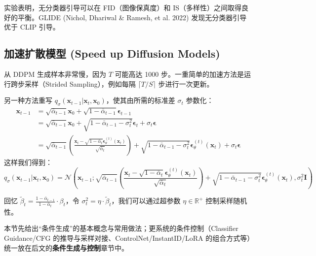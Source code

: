 \documentclass[zihao=-4, fontset=windows]{ctexart}
\begin{document}
实验表明，无分类器引导可以在 FID（图像保真度）和 IS（多样性）之间取得良好的平衡。GLIDE (Nichol, Dhariwal \& Ramesh, et al. 2022) 发现无分类器引导优于 CLIP 引导。

\subsection{加速扩散模型 (Speed up Diffusion Models)}
从 DDPM 生成样本非常慢，因为 $T$ 可能高达 1000 步。一重简单的加速方法是运行跨步采样（Strided Sampling），例如每隔 $\lceil T/S \rceil$ 步进行一次更新。

另一种方法重写 $q_{\sigma}(\mathbf{x}_{t-1} | \mathbf{x}_{t}, \mathbf{x}_{0})$，使其由所需的标准差 $\sigma_t$ 参数化：
\begin{equation}
\begin{aligned}
\mathbf{x}_{t-1} & =\sqrt{\bar{\alpha}_{t-1}} \mathbf{x}_{0}+\sqrt{1-\bar{\alpha}_{t-1}} \boldsymbol{\epsilon}_{t-1} \\
& =\sqrt{\bar{\alpha}_{t-1}} \mathbf{x}_{0}+\sqrt{1-\bar{\alpha}_{t-1}-\sigma_{t}^{2}} \boldsymbol{\epsilon}_{t}+\sigma_{t} \boldsymbol{\epsilon} \\
& =\sqrt{\bar{\alpha}_{t-1}}\left(\frac{\mathbf{x}_{t}-\sqrt{1-\bar{\alpha}_{t}} \boldsymbol{\epsilon}_{\theta}^{(t)}(\mathbf{x}_{t})}{\sqrt{\bar{\alpha}_{t}}}\right)+\sqrt{1-\bar{\alpha}_{t-1}-\sigma_{t}^{2}} \boldsymbol{\epsilon}_{\theta}^{(t)}(\mathbf{x}_{t})+\sigma_{t} \boldsymbol{\epsilon}
\end{aligned}
\end{equation}
这样我们得到：
\begin{equation}
q_{\sigma}(\mathbf{x}_{t-1} | \mathbf{x}_{t}, \mathbf{x}_{0})=\mathcal{N}\left(\mathbf{x}_{t-1} ; \sqrt{\bar{\alpha}_{t-1}}\left(\frac{\mathbf{x}_{t}-\sqrt{1-\bar{\alpha}_{t}} \boldsymbol{\epsilon}_{\theta}^{(t)}(\mathbf{x}_{t})}{\sqrt{\bar{\alpha}_{t}}}\right)+\sqrt{1-\bar{\alpha}_{t-1}-\sigma_{t}^{2}} \boldsymbol{\epsilon}_{\theta}^{(t)}(\mathbf{x}_{t}), \sigma_{t}^{2} \mathbf{I}\right)
\end{equation}

回忆 $\tilde{\beta}_{t} = \frac{1-\bar{\alpha}_{t-1}}{1-\bar{\alpha}_{t}} \cdot \beta_{t}$，令 $\sigma_{t}^{2}=\eta \cdot \tilde{\beta}_{t}$，我们可以通过超参数 $\eta \in \mathbb{R}^+$ 控制采样随机性。

\begin{note}[章节分工]
本节先给出“条件生成”的基本概念与常用做法；更系统的条件控制（Classifier Guidance/CFG 的推导与采样对接、ControlNet/InstantID/LoRA 的组合方式等）统一放在后文的\textbf{条件生成与控制}章节中。
\end{note}
\end{document}
